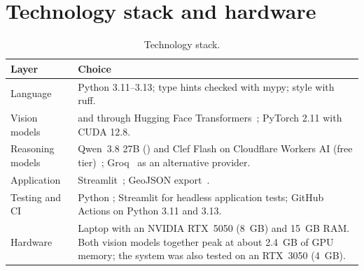 \section{Technology stack and hardware}
\begin{table}[H]
\centering
\caption{Technology stack.}\label{tab:stack}
\begin{small}
\begin{tabularx}{\textwidth}{@{}lY@{}}
\toprule
\textbf{Layer} & \textbf{Choice}\\
\midrule
Language & Python 3.11--3.13; type hints checked with mypy; style with ruff.\\
Vision models &  and  through Hugging Face Transformers~\cite{doc_transformers}; PyTorch 2.11 with CUDA 12.8.\\
Reasoning models & Qwen~3.8 27B () and Clef Flash on Cloudflare Workers AI (free tier)~\cite{doc_cloudflare}; Groq~\cite{doc_groq} as an alternative provider.\\
Application & Streamlit~\cite{doc_streamlit}; GeoJSON export~\cite{rfc7946}.\\
Testing and CI & Python ; Streamlit  for headless application tests; GitHub Actions on Python 3.11 and 3.13.\\
Hardware & Laptop with an NVIDIA RTX~5050 (8~GB) and 15~GB RAM. Both vision models together peak at about 2.4~GB of GPU memory; the system was also tested on an RTX~3050 (4~GB).\\
\bottomrule
\end{tabularx}
\end{small}
\end{table}

